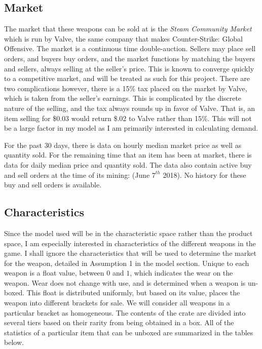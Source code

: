\documentclass[12pt]{paper}
\begin{document}
\subsection{Market}


The market that these weapons can be sold at is the \emph{Steam
  Community Market} which is run by Valve, the same company that makes
Counter-Strike: Global Offensive. The market is a continuous time
double-auction. Sellers may place sell orders, and buyers buy orders,
and the market functions by matching the buyers and sellers, always
selling at the seller's price. This is known to converge quickly to a
competitive market, and will be treated as such for this
project. \cite{Efficiency} There are two complications however, there is a 15\% tax
placed on the market by Valve, which is taken from the seller's
earnings. This is complicated by the discrete nature of the selling,
and the tax always rounds up in favor of Valve. That is, an item
selling for \$0.03 would return \$.02 to Valve rather than 15\%. This
will not be a large factor in my model as I am primarily interested in
calculating demand.

For the past 30 days, there is data on hourly median market price as
well as quantity sold. For the remaining time that an item has been at
market, there is data for daily median price and quantity sold. The
data also contain active buy and sell orders at the time of its
mining: (June $7^{th}$ 2018). No history for these buy and sell orders
is available.

\subsection{Characteristics}

Since the model used will be in the characteristic space rather than
the product space, I am especially interested in characteristics of
the different weapons in the game. I shall ignore the characteristics
that will be used to determine the market for the weapon, detailed in
Assumption 1 in the model section. Unique to each weapon is a float
value, between $0$ and $1$, which indicates the wear on the
weapon. Wear does not change with use, and is determined when a weapon
is un-boxed. This float is distributed uniformly, but based on its
value, places the weapon into different brackets for sale. We will
consider all weapons in a particular bracket as homogeneous. The
contents of the crate are divided into several tiers based on their
rarity from being obtained in a box. All of the statistics of a
particular item that can be unboxed are summarized in the tables
below.
\end{document}
